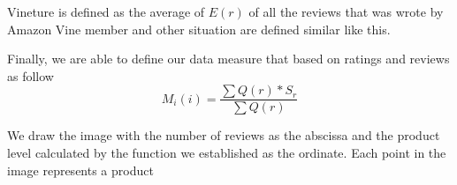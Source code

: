 \documentclass[12pt]{mcmthesis}
\begin{document}
Vineture is defined as the average of $E(r)$ of all the reviews that was wrote by Amazon Vine member and other situation are defined similar like this.

Finally, we are able to define our data measure that based on ratings and reviews as follow$$M_{i}(i)=\frac{\sum Q(r) * S_{r}}{\sum Q(r)}$$

We draw the image with the number of reviews as the abscissa and the product level calculated by the function we established as the ordinate. Each point in the image represents a product
\begin{figure}[htbp]
	\centering
	\quad
\end{figure}
\end{document}
